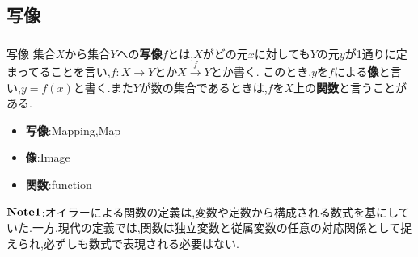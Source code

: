 \documentclass[dvipdfmx,b4j]{jsarticle}
\begin{document}
\subsection{写像}
\subsubsection{}
\begin{definition}{写像}{}
集合$X$から集合$Y$への\textbf{写像}$f$とは,$X$がどの元$x$に対しても$Y$の元$y$が1通りに定まってることを言い,$f\colon X\to Y$とか$X\stackrel{f}{\to}Y$とか書く.
このとき,$y$を$f$による\textbf{像}と言い,$y=f(x)$と書く.また$Y$が数の集合であるときは,$f$を$X$上の\textbf{関数}と言うことがある.
\tcbline
\begin{itemize}
    \item \textbf{写像}:Mapping,Map
    \item \textbf{像}:Image
    \item \textbf{関数}:function
\end{itemize}
%
\end{definition}
\noindent $\bf{Note1}$:オイラーによる関数の定義は,変数や定数から構成される数式を基にしていた.一方,現代の定義では,関数は独立変数と従属変数の任意の対応関係として捉えられ,必ずしも数式で表現される必要はない.
\end{document}
